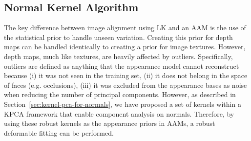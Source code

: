 \subsection{Normal Kernel Algorithm}\label{subsec:aam-normal-kernel}
The key difference between image alignment using LK and an AAM is the use of the statistical prior to handle unseen variation. Creating this prior for depth maps can be handled identically to creating a prior for image textures. However, depth maps, much like textures, are heavily affected by outliers. Specifically, outliers are defined as anything that the appearance model cannot reconstruct because (i) it was not seen in the training set, (ii) it does not belong in the space of faces (e.g. occlusions), (iii) it was excluded from the appearance bases as noise when reducing the number of principal components. However, as described in Section~\ref{sec:kernel-pca-for-normals}, we have proposed a set of kernels within a KPCA framework that enable component analysis on normals. Therefore, by using these robust kernels as the appearance priors in AAMs, a robust deformable fitting can be performed.


